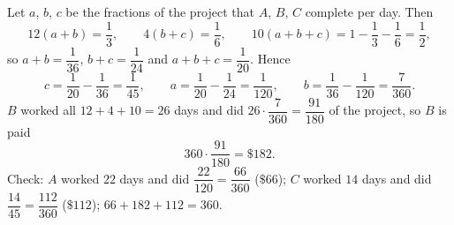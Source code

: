 Let $a$, $b$, $c$ be the fractions of the project that $A$, $B$, $C$ complete per day. Then
\[
12(a+b)=\dfrac{1}{3},\qquad 4(b+c)=\dfrac{1}{6},\qquad 10(a+b+c)=1-\dfrac{1}{3}-\dfrac{1}{6}=\dfrac{1}{2} ,
\]
so $a+b=\dfrac{1}{36}$, $b+c=\dfrac{1}{24}$ and $a+b+c=\dfrac{1}{20}$. Hence
\[
c=\dfrac{1}{20}-\dfrac{1}{36}=\dfrac{1}{45},\qquad a=\dfrac{1}{20}-\dfrac{1}{24}=\dfrac{1}{120},\qquad b=\dfrac{1}{36}-\dfrac{1}{120}=\dfrac{7}{360}.
\]
$B$ worked all $12+4+10=26$ days and did $26\cdot\dfrac{7}{360}=\dfrac{91}{180}$ of the project, so $B$ is paid
\[
360\cdot\dfrac{91}{180}=\boxed{\$182}.
\]
Check: $A$ worked $22$ days and did $\dfrac{22}{120}=\dfrac{66}{360}$ ($\$66$); $C$ worked $14$ days and did $\dfrac{14}{45}=\dfrac{112}{360}$ ($\$112$); $66+182+112=360$.
